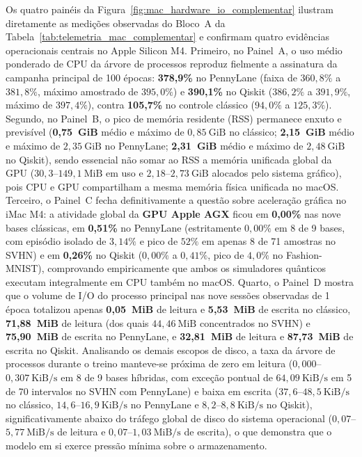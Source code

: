 \documentclass[
    12pt,
    openright,
    oneside,
    a4paper,
    english,
    brazil
]{abntex2}
\begin{document}
Os quatro painéis da Figura~\ref{fig:mac_hardware_io_complementar} ilustram diretamente as medições observadas do Bloco~A da Tabela~\ref{tab:telemetria_mac_complementar} e confirmam quatro evidências operacionais centrais no Apple Silicon M4. Primeiro, no Painel~A, o uso médio ponderado de CPU da árvore de processos reproduz fielmente a assinatura da campanha principal de 100 épocas: \textbf{378,9\%} no PennyLane (faixa de \(360{,}8\%\) a \(381{,}8\%\), máximo amostrado de \(395{,}0\%\)) e \textbf{390,1\%} no Qiskit (\(386{,}2\%\) a \(391{,}9\%\), máximo de \(397{,}4\%\)), contra \textbf{105,7\%} no controle clássico (\(94{,}0\%\) a \(125{,}3\%\)). Segundo, no Painel~B, o pico de memória residente (RSS) permanece enxuto e previsível (\textbf{0,75~GiB} médio e máximo de \(0{,}85~\text{GiB}\) no clássico; \textbf{2,15~GiB} médio e máximo de \(2{,}35~\text{GiB}\) no PennyLane; \textbf{2,31~GiB} médio e máximo de \(2{,}48~\text{GiB}\) no Qiskit), sendo essencial não somar ao RSS a memória unificada global da GPU (\(30{,}3\)--\(149{,}1~\text{MiB}\) em uso e \(2{,}18\)--\(2{,}73~\text{GiB}\) alocados pelo sistema gráfico), pois CPU e GPU compartilham a mesma memória física unificada no macOS. Terceiro, o Painel~C fecha definitivamente a questão sobre aceleração gráfica no iMac M4: a atividade global da \textbf{GPU Apple AGX} ficou em \textbf{0,00\%} nas nove bases clássicas, em \textbf{0,51\%} no PennyLane (estritamente \(0{,}00\%\) em 8 de 9 bases, com episódio isolado de \(3{,}14\%\) e pico de \(52\%\) em apenas 8 de 71 amostras no SVHN) e em \textbf{0,26\%} no Qiskit (\(0{,}00\%\) a \(0{,}41\%\), pico de \(4{,}0\%\) no Fashion-MNIST), comprovando empiricamente que ambos os simuladores quânticos executam integralmente em CPU também no macOS. Quarto, o Painel~D mostra que o volume de I/O do processo principal nas nove sessões observadas de 1 época totalizou apenas \textbf{0,05~MiB} de leitura e \textbf{5,53~MiB} de escrita no clássico, \textbf{71,88~MiB} de leitura (dos quais \(44{,}46~\text{MiB}\) concentrados no SVHN) e \textbf{75,90~MiB} de escrita no PennyLane, e \textbf{32,81~MiB} de leitura e \textbf{87,73~MiB} de escrita no Qiskit. Analisando os demais escopos de disco, a taxa da árvore de processos durante o treino manteve-se próxima de zero em leitura (\(0{,}000\)--\(0{,}307~\text{KiB/s}\) em 8 de 9 bases híbridas, com exceção pontual de \(64{,}09~\text{KiB/s}\) em 5 de 70 intervalos no SVHN com PennyLane) e baixa em escrita (\(37{,}6\)--\(48{,}5~\text{KiB/s}\) no clássico, \(14{,}6\)--\(16{,}9~\text{KiB/s}\) no PennyLane e \(8{,}2\)--\(8{,}8~\text{KiB/s}\) no Qiskit), significativamente abaixo do tráfego global de disco do sistema operacional (\(0{,}07\)--\(5{,}77~\text{MiB/s}\) de leitura e \(0{,}07\)--\(1{,}03~\text{MiB/s}\) de escrita), o que demonstra que o modelo em si exerce pressão mínima sobre o armazenamento.
\end{document}
